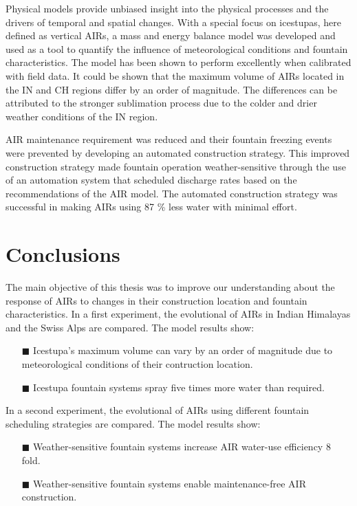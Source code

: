 Physical models provide unbiased insight into the physical processes and the drivers of temporal and spatial
changes. With a special focus on icestupas, here defined as vertical AIRs, a mass and energy balance model was
developed and used as a tool to quantify the influence of meteorological conditions and fountain
characteristics.  The model has been shown to perform excellently when calibrated with field data.  It could be
shown that the maximum volume of AIRs located in the IN and CH regions differ by an order of magnitude. The
differences can be attributed to the stronger sublimation process due to the colder and drier weather conditions
of the IN region. 

AIR maintenance requirement was reduced and their fountain freezing events were prevented by developing an
automated construction strategy. This improved construction strategy made fountain operation weather-sensitive
through the use of an automation system that scheduled discharge rates based on the recommendations of the AIR
model. The automated construction strategy was successful in making AIRs using 87 \% less water with minimal
effort.

\section{Conclusions}

The main objective of this thesis was to improve our understanding about the response of AIRs to changes in
their construction location and fountain characteristics. In a first experiment, the evolutional of AIRs in
Indian Himalayas and the Swiss Alps are compared. The model results show: 

\begin{itemize} 

\item[\tiny{$\blacksquare$}] Icestupa's maximum volume can vary by an order of magnitude due to meteorological
  conditions of their contruction location. 

\item[\tiny{$\blacksquare$}] Icestupa fountain systems spray five times more water than required.

\end{itemize}

In a second experiment, the evolutional of AIRs using different fountain scheduling strategies are compared. The
model results show: 

\begin{itemize} 

\item[\tiny{$\blacksquare$}] Weather-sensitive fountain systems increase AIR water-use efficiency 8 fold.

\item[\tiny{$\blacksquare$}] Weather-sensitive fountain systems enable maintenance-free AIR construction.


\end{itemize}

